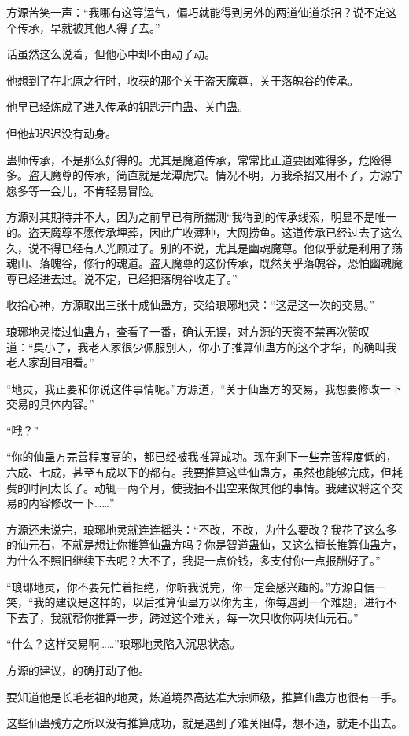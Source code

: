 \begin{this_body}
方源苦笑一声：“我哪有这等运气，偏巧就能得到另外的两道仙道杀招？说不定这个传承，早就被其他人得了去。”

话虽然这么说着，但他心中却不由动了动。

他想到了在北原之行时，收获的那个关于盗天魔尊，关于落魄谷的传承。

他早已经炼成了进入传承的钥匙开门蛊、关门蛊。

但他却迟迟没有动身。

蛊师传承，不是那么好得的。尤其是魔道传承，常常比正道要困难得多，危险得多。盗天魔尊的传承，简直就是龙潭虎穴。情况不明，万我杀招又用不了，方源宁愿多等一会儿，不肯轻易冒险。

方源对其期待并不大，因为之前早已有所揣测“我得到的传承线索，明显不是唯一的。盗天魔尊不愿传承埋葬，因此广收薄种，大网捞鱼。这道传承已经过去了这么久，说不得已经有人光顾过了。别的不说，尤其是幽魂魔尊。他似乎就是利用了荡魂山、落魄谷，修行的魂道。盗天魔尊的这份传承，既然关乎落魄谷，恐怕幽魂魔尊已经进去过。说不定，已经把落魄谷收走了。”

收拾心神，方源取出三张十成仙蛊方，交给琅琊地灵：“这是这一次的交易。”

琅琊地灵接过仙蛊方，查看了一番，确认无误，对方源的天资不禁再次赞叹道：“臭小子，我老人家很少佩服别人，你小子推算仙蛊方的这个才华，的确叫我老人家刮目相看。”

“地灵，我正要和你说这件事情呢。”方源道，“关于仙蛊方的交易，我想要修改一下交易的具体内容。”

“哦？”

“你的仙蛊方完善程度高的，都已经被我推算成功。现在剩下一些完善程度低的，六成、七成，甚至五成以下的都有。我要推算这些仙蛊方，虽然也能够完成，但耗费的时间太长了。动辄一两个月，使我抽不出空来做其他的事情。我建议将这个交易的内容修改一下……”

方源还未说完，琅琊地灵就连连摇头：“不改，不改，为什么要改？我花了这么多的仙元石，不就是想让你推算仙蛊方吗？你是智道蛊仙，又这么擅长推算仙蛊方，为什么不照旧继续下去呢？大不了，我提一点价钱，多支付你一点报酬好了。”

“琅琊地灵，你不要先忙着拒绝，你听我说完，你一定会感兴趣的。”方源自信一笑，“我的建议是这样的，以后推算仙蛊方以你为主，你每遇到一个难题，进行不下去了，我就帮你推算一步，跨过这个难关，每一次只收你两块仙元石。”

“什么？这样交易啊……”琅琊地灵陷入沉思状态。

方源的建议，的确打动了他。

要知道他是长毛老祖的地灵，炼道境界高达准大宗师级，推算仙蛊方也很有一手。

这些仙蛊残方之所以没有推算成功，就是遇到了难关阻碍，想不通，就走不出去。


\end{this_body}
